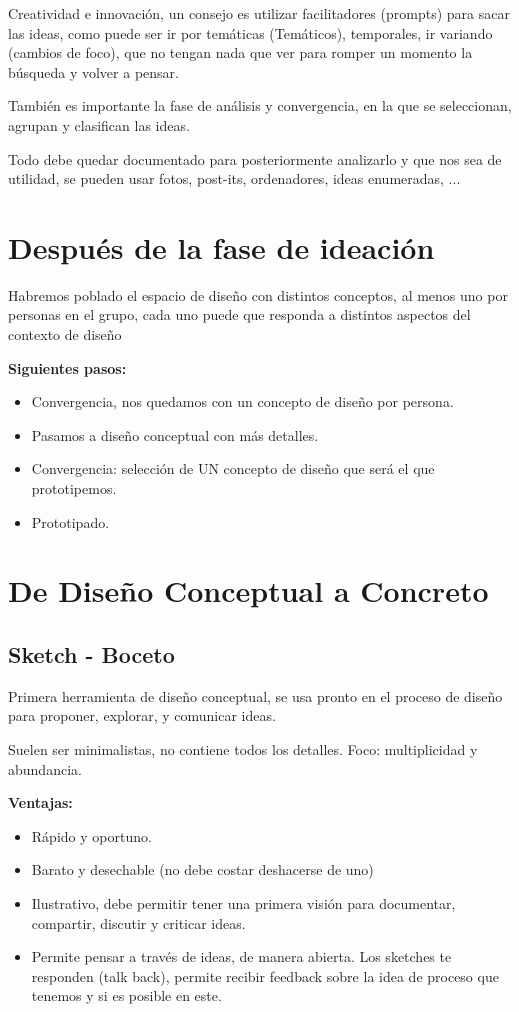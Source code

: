 \documentclass[12pt, twoside, openright]{report} %
\begin{document}
Creatividad e innovación, un consejo es utilizar facilitadores (prompts) para sacar las ideas, como puede ser ir por temáticas (Temáticos), temporales, ir variando (cambios de foco), que no tengan nada que ver para romper un momento la búsqueda y volver a pensar.

También es importante la fase de análisis y convergencia, en la que se seleccionan, agrupan y clasifican las ideas.

Todo debe quedar documentado para posteriormente analizarlo y que nos sea de utilidad, se pueden usar fotos, post-its, ordenadores, ideas enumeradas, ...

\section{Después de la fase de ideación}

Habremos poblado el espacio de diseño con distintos conceptos, al menos uno por personas en el grupo, cada uno puede que responda a distintos aspectos del contexto de diseño

\textbf{Siguientes pasos:}
\begin{itemize}
	\item Convergencia, nos quedamos con un concepto de diseño por persona.
	\item Pasamos a diseño conceptual con más detalles.
	\item Convergencia: selección de UN concepto de diseño que será el que prototipemos.
	\item Prototipado.
\end{itemize}

\section{De Diseño Conceptual a Concreto}
\subsection{Sketch - Boceto}
Primera herramienta de diseño conceptual, se usa pronto en el proceso de diseño para proponer, explorar, y comunicar ideas.

Suelen ser minimalistas, no contiene todos los detalles. Foco: multiplicidad y abundancia.

\textbf{Ventajas:}
\begin{itemize}
	\item Rápido y oportuno.
	\item Barato y desechable (no debe costar deshacerse de uno)
	\item Ilustrativo, debe permitir tener una primera visión para documentar, compartir, discutir y criticar ideas.
	\item Permite pensar a través de ideas, de manera abierta. Los sketches te responden (talk back), permite recibir feedback sobre la idea de proceso que tenemos y si es posible en este.
\end{itemize}
\end{document}
